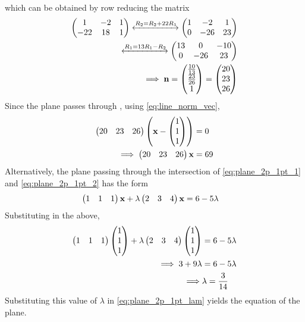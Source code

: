 \documentclass[journal,12pt,twocolumn]{IEEEtran}
\renewcommand\thesection{\arabic{section}}
\begin{document}
\begin{enumerate}[label=\thesection.\arabic*.,ref=\thesection.\theenumi]
\begin{align}
\end{align}
%
which can be obtained by row reducing the matrix
\begin{align}
\begin{pmatrix}
1 & -2 & 1
\\
-22 & 18 & 1
\end{pmatrix}
\xleftrightarrow[]{R_2 = R_2+22R_1}
\begin{pmatrix}
1 & -2 & 1
\\
0  & -26 & 23
\end{pmatrix}
\\
\xleftrightarrow[]{R_1 = 13R_1-R_2}
\begin{pmatrix}
13 & 0 & -10
\\
0  & -26 & 23
\end{pmatrix}
\\
\implies \mathbf{n} = \begin{pmatrix}\frac{10}{13}\\\frac{23}{26}\\1\end{pmatrix} = \begin{pmatrix}20\\23\\26\end{pmatrix}
\end{align}
%
Since the plane passes through , using 
 \eqref{eq:line_norm_vec},
%
\begin{align}
\begin{pmatrix}20 & 23 & 26\end{pmatrix}\left(\mathbf{x}- \begin{pmatrix}1\\1\\1\end{pmatrix}\right) &= 0
\\
\implies 
\begin{pmatrix}20 & 23 & 26\end{pmatrix}\mathbf{x} &= 69
\end{align}
%
Alternatively, the plane passing through the intersection of \eqref{eq:plane_2p_1pt_1} and 
\eqref{eq:plane_2p_1pt_2} has the form 
%
\begin{align}
\label{eq:plane_2p_1pt_lam}
\begin{pmatrix}1 & 1 & 1\end{pmatrix}\mathbf{x} + \lambda \begin{pmatrix}2 & 3 & 4\end{pmatrix}\mathbf{x} &=6 -5\lambda  
\end{align}
%
Substituting  in the above, 
%
\begin{align}
\begin{pmatrix}1 & 1 & 1\end{pmatrix}\begin{pmatrix}1\\1\\1\end{pmatrix} + \lambda \begin{pmatrix}2 & 3 & 4\end{pmatrix}\begin{pmatrix}1\\1\\1\end{pmatrix} &=6 -5\lambda  
\\
\implies 3 + 9\lambda &= 6-5\lambda
\\
\implies &\lambda = \frac{3}{14}
\end{align}
%
Substituting this value of $\lambda $ in \eqref{eq:plane_2p_1pt_lam} yields the equation of the plane.


\end{enumerate}
\end{document}
